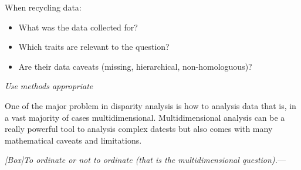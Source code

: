\documentclass[12pt,letterpaper]{article}
\renewcommand{\subsection}[1]{%
\bigskip
\begin{center}
\begin{large}
\normalfont\itshape #1
\end{large}
\end{center}}
\renewcommand{\subsubsection}[1]{%
\vspace{2ex}
\noindent
\textit{#1.}---}
\begin{document}
When recycling data:
\begin{itemize}
    \item What was the data collected for?
    \item Which traits are relevant to the question?
    \item Are their data caveats (missing, hierarchical, non-homologuous)?
\end{itemize}


\subsection{Use methods appropriate} 
One of the major problem in disparity analysis is how to analysis data that is, in a vast majority of cases multidimensional.
Multidimensional analysis can be a really powerful tool to analysis complex datests but also comes with many mathematical caveats and limitations.


\subsubsection{[Box]To ordinate or not to ordinate (that is the multidimensional question)}
\end{document}
